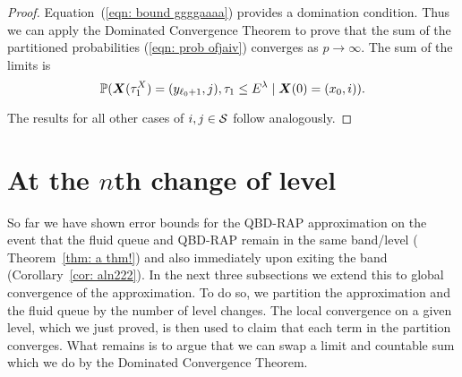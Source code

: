 \begin{proof}
	
	
	Equation~(\ref{eqn: bound ggggaaaa}) provides a domination condition. Thus we can apply the Dominated Convergence Theorem to prove that the sum of the partitioned probabilities (\ref{eqn: prob ofjaiv}) converges as \(p\to\infty\). The sum of the limits is 
	\[\mathbb P(\boldsymbol X(\tau_1^X) = (y_{\ell_0+1}, j), \tau_{1}\leq E^\lambda 
            	 \mid \boldsymbol X(0) = (x_0,i)).\]
	 
	 The results for all other cases of \(i,j\in\mathcal{S}\) follow analogously.
\end{proof}


\section{At the \(n\)th change of level}\label{sec: nth change}

So far we have shown error bounds for the QBD-RAP approximation on the event that the fluid queue and QBD-RAP remain in the same band/level (%
Theorem~\ref{thm: a thm!}) and also immediately upon exiting the band (Corollary~\ref{cor: aln222}). In the next three subsections we extend this to global convergence of the approximation. To do so, we partition the approximation and the fluid queue by the number of level changes. The local convergence on a given level, which we just proved, is then used to claim that each term in the partition converges. What remains is to argue that we can swap a limit and countable sum which we do by the Dominated Convergence Theorem. 

